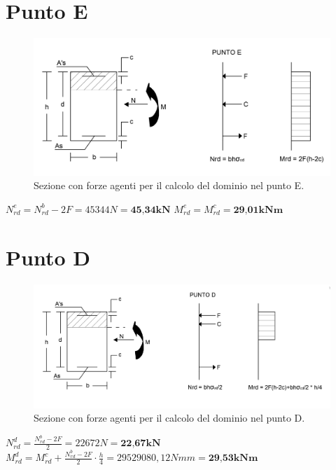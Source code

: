 \documentclass[a4paper,12pt, oneside]{book}
\begin{document}
    \section{Punto E}
    \begin{figure}[H]
    	\centering
    	\includegraphics[width=0.88\linewidth]{"immagini/dominio E"}
    	\caption{Sezione con forze agenti per il calcolo del dominio nel punto E.}
    	\label{fig:dominio-e}
    \end{figure}
    
    $N_{rd}^{e}=N_{rd}^{b}-2F=45344N=\textbf{45,34kN}$
    \leavevmode\newline
    \leavevmode\newline
    $M_{rd}^{e}=M_{rd}^{c}=\textbf{29,01kNm}$
    
    \section{Punto D}
    \begin{figure}[H]
    	\hspace*{.9cm}
    	\centering
    	\includegraphics[width=0.98\linewidth]{"immagini/dominio D"}
    	\caption{Sezione con forze agenti per il calcolo del dominio nel punto D.}
    	\label{fig:dominio-d}
    \end{figure}
    
    $N_{rd}^{d}=\frac{N_{rd}^{b}-2F}{2}=22672N=\textbf{22,67kN}$
    \leavevmode\newline
    \leavevmode\newline
    $M_{rd}^{d}=M_{rd}^{c}+\frac{N_{rd}^{b}-2F}{2}\cdot \frac{h}{4}=29529080,12Nmm=\textbf{29,53kNm}$
    
\end{document}
